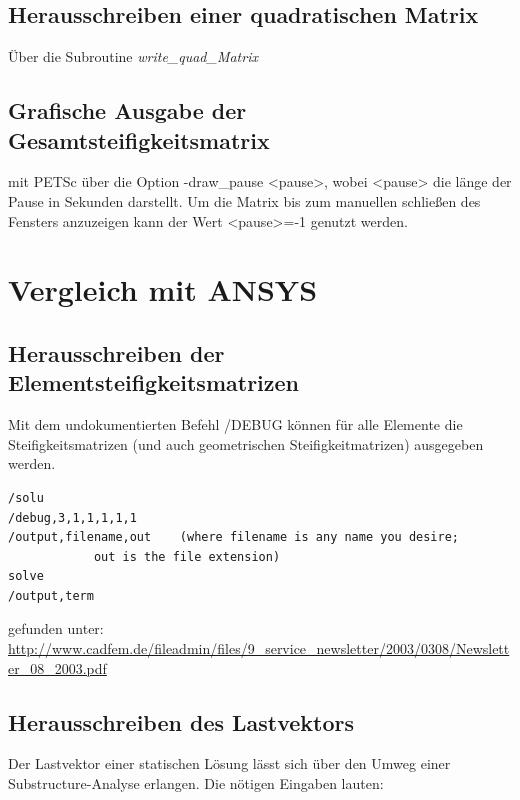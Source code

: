 \documentclass[11pt,titlepage,listof=totoc,bibliography=totoc,twoside]{scrreprt}
\begin{document}
{{\subsection{Herausschreiben einer quadratischen Matrix}

Über die Subroutine \emph{write\_quad\_Matrix}

\subsection{Grafische Ausgabe der Gesamtsteifigkeitsmatrix}

mit PETSc über die Option -draw\_pause <pause>, wobei <pause> die länge der Pause in Sekunden darstellt. Um die Matrix bis zum manuellen schließen des Fensters anzuzeigen kann der Wert <pause>=-1 genutzt werden.

\section{Vergleich mit ANSYS}

\subsection{Herausschreiben der Elementsteifigkeitsmatrizen}

Mit dem undokumentierten Befehl /DEBUG können für alle Elemente die Steifigkeitsmatrizen (und auch geometrischen Steifigkeitmatrizen) ausgegeben werden.

\lstset{language=TeX}
\begin{lstlisting}[columns=fullflexible,basicstyle=\ttfamily,caption=Eingabe zur Ausgabe der Elementsteifigkeitsmatrix in ANSYS,captionpos=b]
/solu
/debug,3,1,1,1,1,1
/output,filename,out	(where filename is any name you desire;
			out is the file extension)
solve 
/output,term
\end{lstlisting}

gefunden unter: \url{http://www.cadfem.de/fileadmin/files/9_service_newsletter/2003/0308/Newsletter_08_2003.pdf}

\subsection{Herausschreiben des Lastvektors}

Der Lastvektor einer statischen Lösung lässt sich über den Umweg einer Substructure-Analyse erlangen. Die nötigen Eingaben lauten:

}}
\end{document}
